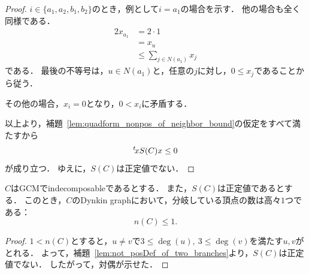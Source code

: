 \begin{proof}
  $i \in \{a_1, a_2, b_1, b_2\}$のとき，例として$i = a_1$の場合を示す．
  他の場合も全く同様である．
  \begin{align}
    2 x_{a_1}
    &= 2 \cdot 1 \\
    &= x_u \\
    &\le \sum_{j \in N(a_1)} x_j
  \end{align}
  である．
  最後の不等号は，$u \in N(a_1)$と，任意の$j$に対し，$0 \le x_j$であることから従う．

  その他の場合，$x_i = 0$となり，$0 < x_i$に矛盾する．
  
  以上より，補題~\ref{lem:quadform_nonpos_of_neighbor_bound}の仮定をすべて満たすから
  \begin{equation}
    {}^t\!x S(C) x \le 0
  \end{equation}
  が成り立つ．
  ゆえに，$S(C)$は正定値でない．
\end{proof}

\begin{theorem}
  \label{thm:pos_numOfBranch_le_one}
  \leanok
  $C$はGCMでindecomposableであるとする．
  また，$S(C)$は正定値であるとする．
  このとき，$C$のDynkin graphにおいて，分岐している頂点の数は高々$1$つである：
  \begin{equation}
    n(C) \le 1.
  \end{equation}
\end{theorem}

\begin{proof}
  $1 < n(C)$とすると，$u \ne v$で$3 \le \deg(u),\ 3 \le \deg(v)$を満たす$u, v$がとれる．
  よって，補題~\ref{lem:not_posDef_of_two_branches}より，$S(C)$は正定値でない．
  したがって，対偶が示せた．
\end{proof}